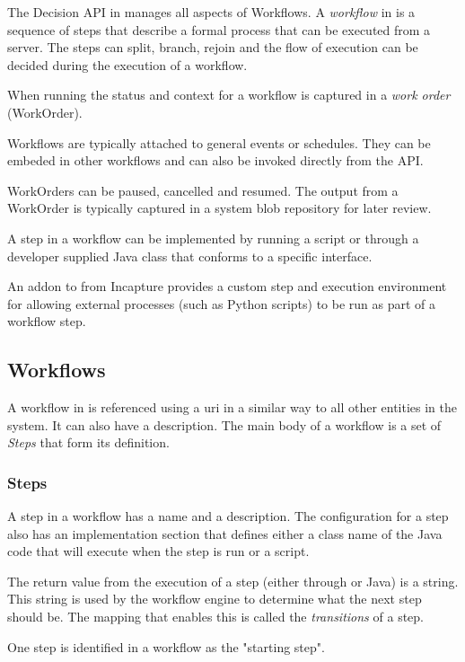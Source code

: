 The Decision API in \Rapture manages all aspects of Workflows. A \emph{workflow} in \Rapture
is a sequence of steps that describe a formal process that can be executed from a \Rapture
server. The steps can split, branch, rejoin and the flow of execution can be decided during
the execution of a workflow.

When running the status and context for a workflow is captured in a \emph{work order} (WorkOrder).

Workflows are typically attached to general events or schedules. They can be embeded in other
workflows and can also be invoked directly from the API.

WorkOrders can be paused, cancelled and resumed. The output from a WorkOrder is typically captured
in a system blob repository for later review.

A step in a workflow can be implemented by running a \Reflex script or through a developer supplied
Java class that conforms to a specific interface.

An addon to \Rapture from Incapture provides a custom step and execution environment for allowing
external processes (such as Python scripts) to be run as part of a workflow step.

\subsection{Workflows}

A workflow in \Rapture is referenced using a uri in a similar way to all other entities in the system. It can also
have a description. The main body of a workflow is a set of \emph{Steps} that form its definition.

\subsubsection{Steps}

A step in a workflow has a name and a description. The configuration for a step also has an implementation
section that defines either a class name of the Java code that will execute when the step is run or a \Reflex
script.

The return value from the execution of a step (either through \Reflex or Java) is a string. This string is used
by the workflow engine to determine what the next step should be. The mapping that enables this is called the
\emph{transitions} of a step.

One step is identified in a workflow as the "starting step".

